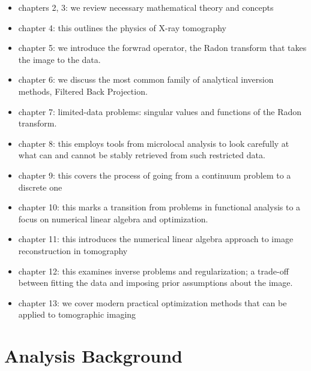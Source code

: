 \documentclass{article}
\begin{document}
\begin{itemize}
	 \item chapters 2, 3: we review necessary mathematical theory and concepts
	 \item chapter 4: this outlines the physics of X-ray tomography
	 \item chapter 5: we introduce the forwrad operator, the Radon transform that takes the image to the data.
	 \item chapter 6: we discuss the most common family of analytical inversion methods, Filtered Back Projection.
	 \item chapter 7: limited-data problems: singular values and functions of the Radon transform.
\item chapter 8: this employs tools from microlocal analysis to look carefully at what can and cannot be stably retrieved from such restricted data.
\item chapter 9: this covers the process of going from a continuum problem to a discrete one
\item chapter 10: this marks a transition from problems in functional analysis to a focus on numerical linear algebra and optimization.
\item chapter 11: this introduces the numerical linear algebra approach to image reconstruction in tomography
\item chapter 12: this examines inverse problems and regularization; a trade-off between fitting the data and imposing prior assumptions about the image.
\item chapter 13: we cover modern practical optimization methods that can be applied to tomographic imaging
\end{itemize}
\section{Analysis Background}
\end{document}
